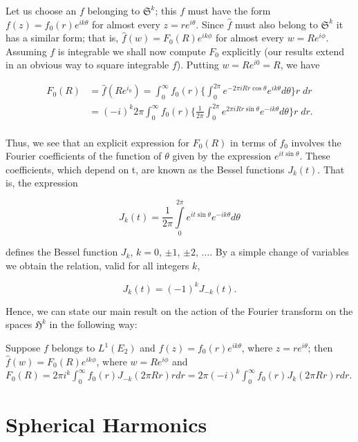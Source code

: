 Let us choose an $f$ belonging to $\mathfrak{S}^k$; this $f$ must have the form $f(z) = f_0(r)e^{ik\theta}$ for almost every $z = re^{i\theta}$. Since $\hat{f}$ must also belong to $\mathfrak{S}^k$ it has a similar form; that is, $\hat{f}(w) = F_0(R)e^{ik\phi}$ for almost every $w = Re^{i\phi}$. Assuming $f$ is integrable we shall now compute $F_0$ explicitly (our results extend in an obvious way to square integrable $f$). Putting $w = Re^{i0} = R$, we have

\[
\begin{aligned}{F_{0}(R)}&{{}=\hat{f}(Re^{i_{0}})=\int_{0}^{\infty}f_{0}(r)\Biggl\{\int_{0}^{2\pi}e^{-2\pi i R r\cos\theta}e^{i k\theta}d\theta\Biggr\}r\;d r}\\ {}&{{}=(-i)^{k}2\pi\int_{0}^{\infty}f_{0}(r)\Biggl\{\frac{1}{2\pi}\int_{0}^{2\pi}e^{2\pi i R r\sin\theta}e^{-i k\theta}d\theta\Biggr\}r\;d r.}\\ \end{aligned}
\]

Thus, we see that an explicit expression for $F_0(R)$ in terms of $f_0$ involves the Fourier coefficients of the function of $\theta$ given by the expression $e^{i t \sin \theta}$. These coefficients, which depend on t, are known as the Bessel functions $J_k(t)$. That is, the expression

\[
J_{k}(t) = \frac{1}{2\pi} \int\limits_{0}^{2\pi}e^{i t\sin\theta}e^{-i k\theta} d\theta
\]

defines the Bessel function $J_k$, $k = 0$, $\pm 1$, $\pm 2$, $\ldots$. By a simple change of variables we obtain the relation, valid for all integers $k$,

\begin{equation}\label{eq:c4-1-5}
J_{k}(t)=(-1)^{k}J_{-k}(t).
\end{equation}

Hence, we can state our main result on the action of the Fourier transform on the spaces $\mathfrak{H}^k$ in the following way:

\begin{theorem}
\label{thm:c4-1-6}
Suppose $f$ belongs to $L^{1}(E_{2})$ and $f(z)=f_{0}(r)e^{ik\theta}$, where $z=re^{i\theta}$; then $\hat{f}(w)=F_{0}(R)e^{ik\phi}$, where $w=Re^{i\phi}$ and $F_{0}(R)=2\pi i^{k}\int_{0}^{\infty}f_{0}(r)J_{-k}(2\pi Rr)r dr=2\pi(-i)^{k}\int_{0}^{\infty}f_{0}(r)J_{k}(2\pi Rr)r dr$.
\end{theorem}

\section{Spherical Harmonics}

